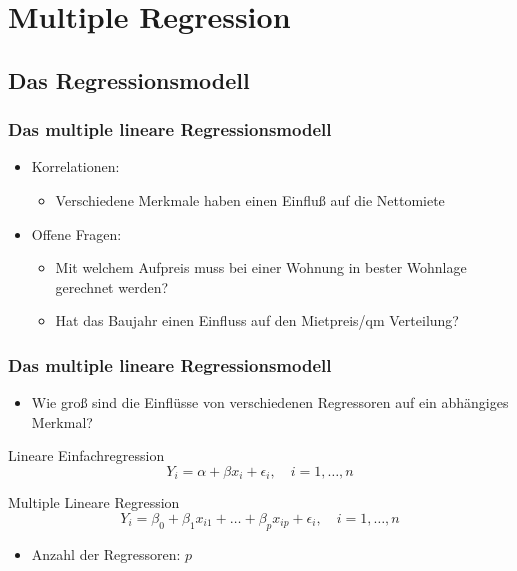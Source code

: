 \documentclass{beamer}
\begin{document}
\section{Multiple Regression}

\subsection{Das Regressionsmodell}

\begin{frame}
 \frametitle{Das multiple lineare Regressionsmodell}
 \begin{itemize}
 \item Korrelationen:
   \begin{itemize}
   \item Verschiedene Merkmale haben einen Einfluß auf die Nettomiete
   \end{itemize}
 \item Offene Fragen:
   \begin{itemize}
   \item Mit welchem Aufpreis muss bei einer Wohnung in bester Wohnlage gerechnet werden?
   \item Hat das Baujahr einen Einfluss auf den Mietpreis/qm Verteilung?
   \end{itemize}
 \end{itemize}

 
\end{frame}



\begin{frame}
 \frametitle{Das multiple lineare Regressionsmodell}

 \begin{itemize}
  \item Wie groß sind die Einflüsse von verschiedenen Regressoren auf ein abhängiges Merkmal?
 \end{itemize}
 
 \begin{block}{Lineare Einfachregression}
  \begin{equation*}
   Y_i = \alpha + \beta x_i + \epsilon_i, \quad i = 1, \dots, n
  \end{equation*}
 \end{block}

 \begin{block}{Multiple Lineare Regression}
  \begin{equation*}
   Y_i = \beta_0 + \beta_1 x_{i1} + \dots + \beta_p x_{ip} + \epsilon_i, \quad i = 1, \dots, n
  \end{equation*}
  \begin{itemize}
   \item Anzahl der Regressoren: $p$
  \end{itemize}

 \end{block}

\end{frame}
\end{document}
